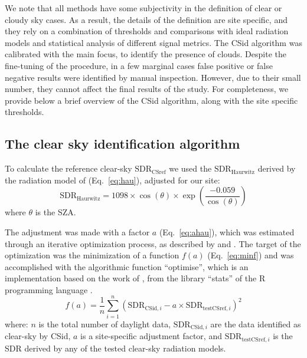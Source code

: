 \documentclass[applsci,article,submit,moreauthors,pdftex]{Definitions/mdpi}
\begin{document}
We note that all methods have some subjectivity in the definition of
clear or cloudy sky cases. As a result, the details of the definition
are site specific, and they rely on a combination of thresholds and
comparisons with ideal radiation models and statistical analysis of
different signal metrics. The CSid algorithm was calibrated with the
main focus, to identify the presence of clouds. Despite the fine-tuning
of the procedure, in a few marginal cases false positive or false
negative results were identified by manual inspection. However, due to
their small number, they cannot affect the final results of the study.
For completeness, we provide below a brief overview of the CSid
algorithm, along with the site specific thresholds.

\hypertarget{CDIDalgorithm}{%
\subsection{The clear sky identification
algorithm}\label{CDIDalgorithm}}

To calculate the reference clear-sky \(\text{SDR}_\text{CSref}\) we used
the \(\text{SDR}_\text{Haurwitz}\) derived by the radiation model of
\citet{Haurwitz1945} (Eq.~\ref{eq:hau}), adjusted for our site:
\begin{equation}
\text{SDR}_\text{Haurwitz} = 1098 \times \cos(\theta) \times \exp \left( \frac{ - 0.059}{\cos(\theta)} \right) \label{eq:hau}
\end{equation} where \(\theta\) is the SZA.

The adjustment was made with a factor \(a\) (Eq.~\ref{eq:ahau}), which
was estimated through an iterative optimization process, as described by
\citet{Long2000} and \citet{Reno2016}. The target of the optimization
was the minimization of a function \(f(a)\) (Eq.~\ref{eq:minf}) and was
accomplished with the algorithmic function ``optimise'', which is an
implementation based on the work of \citet{Brent1973}, from the library
``stats'' of the R programming language \citep{RCT2023}.
\begin{equation}
f(a) = \frac{1}{n}\sum_{i=1}^{n} ( \text{SDR}_{\text{CSid},i} - a \times \text{SDR}_{\text{testCSref},i} )^2 \label{eq:minf}
\end{equation} where: \(n\) is the total number of daylight data,
\(\text{SDR}_{\text{CSid},i}\) are the data identified as clear-sky by
CSid, \(a\) is a site-specific adjustment factor, and
\(\text{SDR}_{\text{testCSref},i}\) is the SDR derived by any of the
tested clear-sky radiation models.
\end{document}
